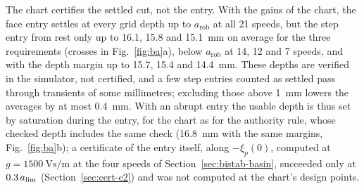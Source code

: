 The chart certifies the settled cut, not the entry. With the gains of the chart, the face entry settles at every grid depth up to $a_{\mathrm{rob}}$ at all 21 speeds, but the step entry from rest only up to 16.1, 15.8 and \SI{15.1}{\milli\metre} on average for the three requirements (crosses in Fig.~\ref{fig:ba}a), below $a_{\mathrm{rob}}$ at 14, 12 and 7 speeds, and with the depth margin up to 15.7, 15.4 and \SI{14.4}{\milli\metre}. These depths are verified in the simulator, not certified, and a few step entries counted as settled pass through transients of some millimetres; excluding those above \SI{1}{\milli\metre} lowers the averages by at most \SI{0.4}{\milli\metre}. With an abrupt entry the usable depth is thus set by saturation during the entry, for the chart as for the authority rule, whose checked depth includes the same check (\SI{16.8}{\milli\metre} with the same margins, Fig.~\ref{fig:ba}b); a certificate of the entry itself, along $-\xi_p(0)$, computed at $g=\SI{1500}{\volt\second\per\metre}$ at the four speeds of Section~\ref{sec:bistab-basin}, succeeded only at $0.3\,a_{\lim}$ (Section~\ref{sec:cert-c2}) and was not computed at the chart's design points.

